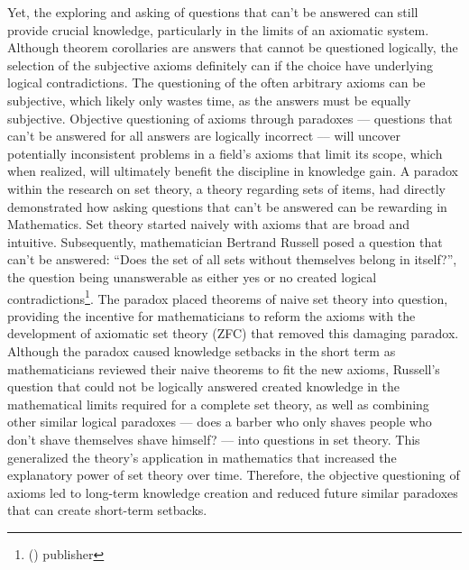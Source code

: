 \documentclass[a4paper,12pt]{article}
\newcommand{\citefoot}[1]{\footnote{\citeall{#1}}}
\newcommand{\citeall}[1]{\citeauth{#1} \citetitle{#1} (\citeyear{#1}) publisher \citelist{#1}{publisher}}
\begin{document}
Yet, the exploring and asking of questions that can’t be answered can still provide crucial knowledge, particularly in the limits of an axiomatic system. Although theorem corollaries are answers that cannot be questioned logically, the selection of the subjective axioms definitely can if the choice have underlying logical contradictions. The questioning of the often arbitrary axioms can be subjective, which likely only wastes time, as the answers must be equally subjective. Objective questioning of axioms through paradoxes --- questions that can’t be answered for all answers are logically incorrect --– will uncover potentially inconsistent problems in a field's axioms that limit its scope, which when realized, will ultimately benefit the discipline in knowledge gain. A paradox within the research on set theory, a theory regarding sets of items, had directly demonstrated how asking questions that can’t be answered can be rewarding in Mathematics. Set theory started naively with axioms that are broad and intuitive. Subsequently, mathematician Bertrand Russell posed a question that can’t be answered: ``Does the set of all sets without themselves belong in itself?'', the question being unanswerable as either yes or no created logical contradictions\citefoot{irvine_deutsch_2020}. The paradox placed theorems of naive set theory into question, providing the incentive for mathematicians to reform the axioms with the development of axiomatic set theory (ZFC) that removed this damaging paradox. Although the paradox caused knowledge setbacks in the short term as mathematicians reviewed their naive theorems to fit the new axioms, Russell’s question that could not be logically answered created knowledge in the mathematical limits required for a complete set theory, as well as combining other similar logical paradoxes --- does a barber who only shaves people who don’t shave themselves shave himself? --- into questions in set theory. This generalized the theory's application in mathematics that increased the explanatory power of set theory over time. Therefore, the objective questioning of axioms led to long-term knowledge creation and reduced future similar paradoxes that can create short-term setbacks.


\end{document}
